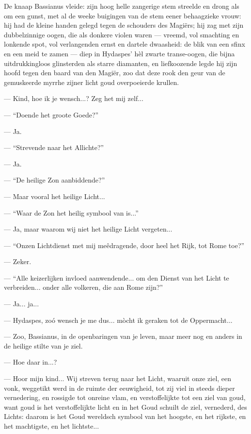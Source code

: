 \documentclass[a4paper, 12pt, oneside, dutch]{article}
\begin{document}
De knaap Bassianus vleide: zijn hoog helle zangerige stem streelde en drong als om een gunst, met al de weeke buigingen van de stem eener behaagzieke vrouw: hij had de kleine handen gelegd tegen de schouders des Magiërs; hij zag met zijn dubbelzinnige oogen, die als donkere violen waren --- vreemd, vol smachting en lonkende spot, vol verlangenden ernst en dartele dwaasheid: de blik van een sfinx en een meid te zamen --- diep in Hydaspes' hèl zwarte transe-oogen, die bijna uitdrukkingloos glinsterden als starre diamanten, en liefkoozende legde hij zijn hoofd tegen den baard van den Magiër, zoo dat deze rook den geur van de gemuskeerde myrrhe zijner licht goud overpoeierde krullen.

--- Kind, hoe ik je wensch...? Zeg het mij zelf...

--- "`Doende het groote Goede?"'

--- Ja.

--- "`Strevende naar het Allichte?"'

--- Ja.

--- "`De heilige Zon aanbiddende?"'

--- Maar vooral het heilige Licht...

--- "`Waar de Zon het heilig symbool van is..."'

--- Ja, maar waarom wij niet het heilige Licht vergeten...

--- "`Onzen Lichtdienst met mij meêdragende, door heel het Rijk, tot Rome toe?"'

--- Zeker.

--- "`Alle keizerlijken invloed aanwendende... om den Dienst van het Licht te verbreiden... onder alle volkeren, die aan Rome zijn?"'

--- Ja... ja...

--- Hydaspes, zoó wensch je me dus... mòcht ik geraken tot de Oppermacht...

--- Zoo, Bassianus, in de openbaringen van je leven, maar meer nog en anders in de heilige stilte van je ziel.

--- Hoe daar in...?

--- Hoor mijn kind... Wij streven terug naar het Licht, waaruit onze ziel, een vonk, weggetikt werd in de ruimte der eeuwigheid, tot zij viel in steeds dieper vernedering, en rossigde tot onreine vlam, en verstoffelijkte tot een ziel van goud, want goud is het verstoffelijkte licht en in het Goud schuilt de ziel, vernederd, des Lichts: daarom is het Goud wereldsch symbool van het hoogste, en het rijkste, en het machtigste, en het lichtste...
\end{document}
